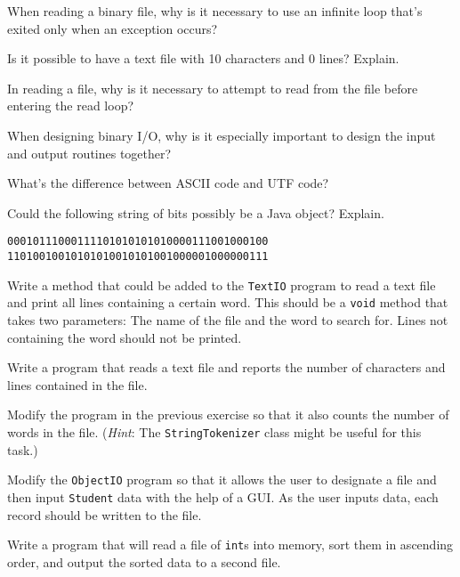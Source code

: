 \begin{EXRtwo}
\item  When reading a binary file, why is it necessary
to use an infinite loop that's exited only when an
exception occurs?

\item  Is it possible to have a text file with 10 characters
and 0 lines? Explain.

\item  In reading a file, why is it necessary to attempt
to read from the file before entering the read loop?

\item  When designing binary I/O, why is it especially
important to design the input and output routines
together?

\item  What's the difference between ASCII code and
UTF code?

\item  Could the following string of bits possibly be
a Java object?  Explain.

\begin{jjjlisting}
\begin{lstlisting}
00010111000111101010101010000111001000100
11010010010101010010101001000001000000111
\end{lstlisting}
\end{jjjlisting}

\item  Write a method that could be added to the {\tt TextIO}
program to read a text file and print all lines containing a
certain word.  This should be a {\tt void} method that takes two
parameters: The name of the file and the word to search for.  Lines not
containing the word should not be printed.

\item  Write a program that reads a text file and reports the
number of characters and lines contained in the file.

\item  Modify the program in the previous exercise so that it
also counts the number of words in the file.   ({\it Hint}: The
{\tt StringTokenizer} class might be useful for this task.)

\item  Modify the {\tt ObjectIO} program so that it allows the
user to designate a file and then input {\tt Student} data with
the help of a GUI.  As the user inputs data, each record should
be written to the file.

\item  Write a program that will read a file of {\tt int}s into
memory, sort them in ascending order, and output the sorted
data to a second file.


\end{EXRtwo}
